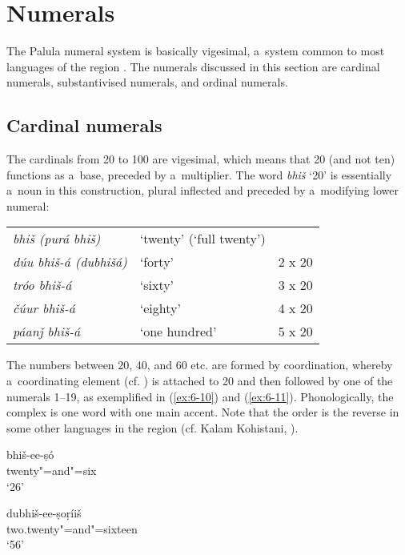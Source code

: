 \section{Numerals}
\label{sec:6-4}

The Palula numeral system is basically vigesimal, a~system common to most languages of the region \citep[823]{bashir2003}. The numerals discussed in this section are cardinal numerals, substantivised numerals, and ordinal numerals.


\subsection{Cardinal numerals}
\label{subsec:6-4-1}

The cardinals from 20 to 100 are vigesimal, which means that 20 (and not ten) functions as a~base, preceded by a~multiplier. The word \textit{bhiš} `20' is essentially a~noun in this construction, plural inflected and preceded by a~modifying lower numeral: 



\begin{table}[H]
\begin{tabularx}{\textwidth}{ Q Q l@{\hspace{50pt}} }

\textit{bhiš (purá bhiš)} &
`twenty' (`full twenty') &
\\
\textit{dúu bhiš-á (dubhišá)} &
`forty' &
2 x 20\\
\textit{tróo bhiš-á} &
`sixty' &
3 x 20\\
\textit{čúur bhiš-á} &
`eighty' &
4 x 20\\
\textit{páanǰ bhiš-á} &
`one hundred' &
5 x 20\\
\end{tabularx}
\end{table}


The numbers between 20, 40, and 60 etc. are formed by coordination, whereby a~coordinating element (cf. ) is attached to 20 and then followed by one of the numerals 1--19, as exemplified in (\ref{ex:6-10}) and (\ref{ex:6-11}). Phonologically, the complex is one word with one main accent. Note that the order is the reverse in some other languages in the region (cf. Kalam Kohistani, \citealt[57]{baart1999a}).

\begin{exe}
\ex
\label{ex:6-10}
\gll bhiš-ee-ṣó \\
twenty"=and"=six \\
\glt `26'

\ex
\label{ex:6-11}
\gll dubhiš-ee-ṣoṛíiš \\
two.twenty"=and"=sixteen \\
\glt `56'
\end{exe}

